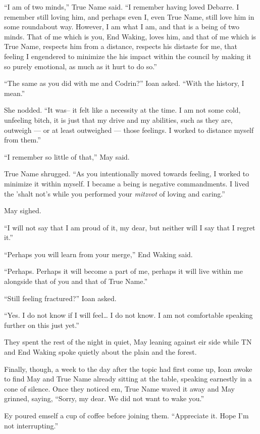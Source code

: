 ``I am of two minds,'' True Name said. ``I remember having loved Debarre. I remember still loving him, and perhaps even I, even True Name, still love him in some roundabout way. However, I am what I am, and that is a being of two minds. That of me which is you, End Waking, loves him, and that of me which is True Name, respects him from a distance, respects his distaste for me, that feeling I engendered to minimize the his impact within the council by making it so purely emotional, as much as it hurt to do so.''

``The same as you did with me and Codrin?'' Ioan asked. ``With the history, I mean.''

She nodded. ``It was-- it felt like a necessity at the time. I am not some cold, unfeeling bitch, it is just that my drive and my abilities, such as they are, outweigh — or at least outweighed — those feelings. I worked to distance myself from them.''

``I remember so little of that,'' May said.

True Name shrugged. ``As you intentionally moved towards feeling, I worked to minimize it within myself. I became a being is negative commandments. I lived the 'shalt not's while you performed your \emph{mitzvot} of loving and caring.''

May sighed.

``I will not say that I am proud of it, my dear, but neither will I say that I regret it.''

``Perhaps you will learn from your merge,'' End Waking said.

``Perhaps. Perhaps it will become a part of me, perhaps it will live within me alongside that of you and that of True Name.''

``Still feeling fractured?'' Ioan asked.

``Yes. I do not know if I will feel\ldots{} I do not know. I am not comfortable speaking further on this just yet.''

They spent the rest of the night in quiet, May leaning against eir side while TN and End Waking spoke quietly about the plain and the forest.

Finally, though, a week to the day after the topic had first come up, Ioan awoke to find May and True Name already sitting at the table, speaking earnestly in a cone of silence. Once they noticed em, True Name waved it away and May grinned, saying, ``Sorry, my dear. We did not want to wake you.''

Ey poured emself a cup of coffee before joining them. ``Appreciate it. Hope I'm not interrupting.''

